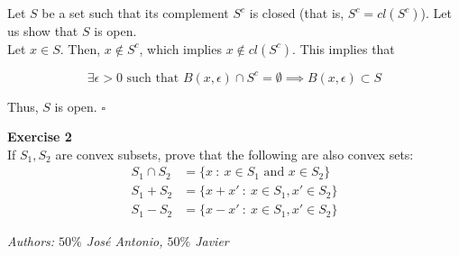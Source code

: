 \documentclass[11pt,table]{article}
\newcommand{\qed}{\hfill $\square$}
\newenvironment{problem}[2][Exercise]
{ \begin{mdframed}[backgroundcolor=gray!20] \textbf{#1 #2} \\}
	{\hspace{0.0cm}\newline\newline \emph{Authors: \(50\%\) José Antonio, \(50\%\) Javier}  \end{mdframed}}
\begin{document}
Let \(S\) be a set such that its complement $S^c$ is closed (that is, \(S^c = cl(S^c)\)). Let us show that \(S\) is open. \\

Let \(x \in S\). Then, \(x \notin S^c\), which implies \(x \notin cl(S^c)\). This implies that

\[
	\exists \epsilon > 0 \text{ such that } B(x,\epsilon) \cap S^c = \emptyset \implies B(x,\epsilon) \subset S
\]

Thus, $S$ is open. \qed \\

\begin{problem}{2}
If \( S_1, S_2 \) are convex subsets, prove that the following are also convex sets:
\begin{align*}
	S_{1} \cap S_{2} & = \{x \ : \ x \in S_{1} \text{ and } x \in S_{2}\} \\
	S_{1} + S_{2}    & = \{x + x' \ : \ x \in S_{1}, x' \in S_{2}\}       \\
	S_{1} - S_{2}    & = \{x - x' \ : \ x \in S_{1}, x' \in S_{2}\}
\end{align*}

\end{problem}
\end{document}
